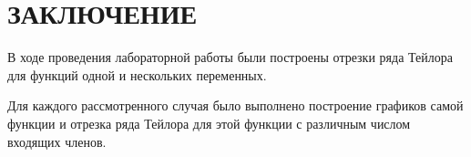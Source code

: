 \section*{ЗАКЛЮЧЕНИЕ}

В ходе проведения лабораторной работы были построены отрезки ряда Тейлора
для функций одной и нескольких переменных.

Для каждого рассмотренного случая было выполнено построение графиков
самой функции и отрезка ряда Тейлора для этой функции с различным числом
входящих членов. 

\newpage
